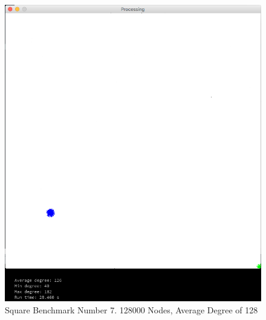 \documentclass{article}
\begin{document}
\begin{figure}
    \centering
    \includegraphics[scale=0.45]{./images/square_6.png}
    \caption{Square Benchmark Number 7. 128000 Nodes, Average Degree of 128}
    \label{square6}
\end{figure}
\end{document}
